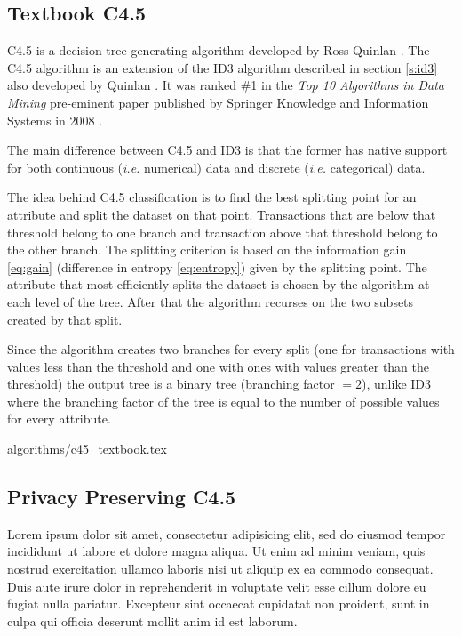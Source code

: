 \subsection{Textbook C4.5}\label{s:c45}
C4.5 is a decision tree generating algorithm developed by Ross Quinlan \cite{quinlan1993c4}.
The C4.5 algorithm is an extension of the ID3 algorithm described in section \ref{s:id3} also developed by Quinlan \cite{quinlan1986induction}.
It was ranked \#1 in the \textit{Top 10 Algorithms in Data Mining} pre\hyp eminent paper published by Springer Knowledge and Information Systems in 2008 \cite{wu2008top}.

The main difference between C4.5 and ID3 is that the former has native support for both continuous (\textit{i.e.} numerical) data and discrete (\textit{i.e.} categorical) data.

The idea behind C4.5 classification is to find the best splitting point for an attribute and split the dataset on that point.
Transactions that are below that threshold belong to one branch and transaction above that threshold belong to the other branch.
The splitting criterion is based on the information gain \ref{eq:gain} (difference in entropy \ref{eq:entropy}) given by the splitting point.
The attribute that most efficiently splits the dataset is chosen by the algorithm at each level of the tree.
After that the algorithm recurses on the two subsets created by that split.

Since the algorithm creates two branches for every split (one for transactions with values less than the threshold and one with ones with values greater than the threshold) the output tree is a binary tree (branching factor $= 2$), unlike ID3 where the branching factor of the tree is equal to the number of possible values for every attribute.

{algorithms/c45_textbook.tex}

\subsection{Privacy Preserving C4.5}\label{s:pp-c45}
Lorem ipsum dolor sit amet, consectetur adipisicing elit, sed do eiusmod tempor incididunt ut labore et dolore magna aliqua. Ut enim ad minim veniam, quis nostrud exercitation ullamco laboris nisi ut aliquip ex ea commodo consequat. Duis aute irure dolor in reprehenderit in voluptate velit esse cillum dolore eu fugiat nulla pariatur. Excepteur sint occaecat cupidatat non proident, sunt in culpa qui officia deserunt mollit anim id est laborum.


